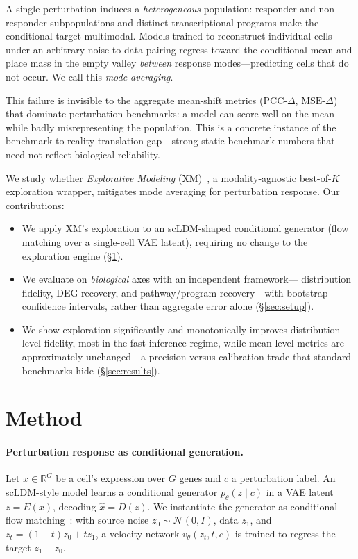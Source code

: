 \documentclass{article}
\begin{document}
A single perturbation induces a \emph{heterogeneous} population: responder and
non-responder subpopulations and distinct transcriptional programs make the
conditional target multimodal. Models trained to reconstruct individual cells
under an arbitrary noise-to-data pairing regress toward the conditional mean and
place mass in the empty valley \emph{between} response modes---predicting cells
that do not occur. We call this \emph{mode averaging}.

This failure is invisible to the aggregate mean-shift metrics
($\text{PCC-}\Delta$, $\text{MSE-}\Delta$) that dominate perturbation
benchmarks: a model can score well on the mean while badly misrepresenting the
population. This is a concrete instance of the benchmark-to-reality translation
gap---strong static-benchmark numbers that need not reflect biological
reliability.

We study whether \emph{Explorative Modeling} (XM)~\citep{xm}, a modality-agnostic
best-of-$K$ exploration wrapper, mitigates mode averaging for perturbation
response. Our contributions:
\begin{itemize}
  \item We apply XM's exploration to an scLDM-shaped conditional generator
  (flow matching over a single-cell VAE latent), requiring no change to the
  exploration engine (\S\ref{sec:method}).
  \item We evaluate on \emph{biological} axes with an independent framework---
  distribution fidelity, DEG recovery, and pathway/program recovery---with
  bootstrap confidence intervals, rather than aggregate error alone
  (\S\ref{sec:setup}).
  \item We show exploration significantly and monotonically improves
  distribution-level fidelity, most in the fast-inference regime, while
  mean-level metrics are approximately unchanged---a precision-versus-calibration
  trade that standard benchmarks hide (\S\ref{sec:results}).
\end{itemize}

\section{Method}
\label{sec:method}

\paragraph{Perturbation response as conditional generation.}
Let $x\in\mathbb{R}^{G}$ be a cell's expression over $G$ genes and $c$ a
perturbation label. An scLDM-style model learns a conditional generator
$p_\theta(z\mid c)$ in a VAE latent $z=E(x)$, decoding $\hat{x}=D(z)$. We
instantiate the generator as conditional flow matching~\citep{flowmatching,
liprince}: with source noise $z_0\sim\mathcal{N}(0,I)$, data $z_1$, and
$z_t=(1-t)z_0+t z_1$, a velocity network $v_\theta(z_t,t,c)$ is trained to
regress the target $z_1-z_0$.
\end{document}
